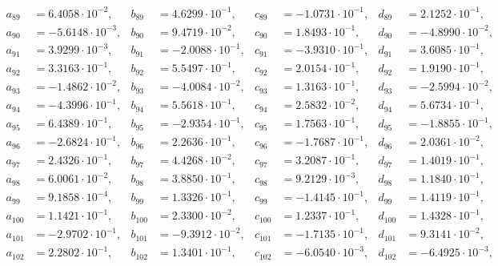 \begin{align*}
  a_{ 89 } &= 6.4058 \cdot 10^{ -2 }, & b_{ 89 } &= 4.6299 \cdot 10^{ -1 }, & c_{ 89 } &= -1.0731 \cdot 10^{ -1 }, & d_{ 89 } &= 2.1252 \cdot 10^{ -1 }, \\ 
  a_{ 90 } &= -5.6148 \cdot 10^{ -3 }, & b_{ 90 } &= 9.4719 \cdot 10^{ -2 }, & c_{ 90 } &= 1.8493 \cdot 10^{ -1 }, & d_{ 90 } &= -4.8990 \cdot 10^{ -2 }, \\ 
  a_{ 91 } &= 3.9299 \cdot 10^{ -3 }, & b_{ 91 } &= -2.0088 \cdot 10^{ -1 }, & c_{ 91 } &= -3.9310 \cdot 10^{ -1 }, & d_{ 91 } &= 3.6085 \cdot 10^{ -1 }, \\ 
  a_{ 92 } &= 3.3163 \cdot 10^{ -1 }, & b_{ 92 } &= 5.5497 \cdot 10^{ -1 }, & c_{ 92 } &= 2.0154 \cdot 10^{ -1 }, & d_{ 92 } &= 1.9190 \cdot 10^{ -1 }, \\ 
  a_{ 93 } &= -1.4862 \cdot 10^{ -2 }, & b_{ 93 } &= -4.0084 \cdot 10^{ -2 }, & c_{ 93 } &= 1.3163 \cdot 10^{ -1 }, & d_{ 93 } &= -2.5994 \cdot 10^{ -2 }, \\ 
  a_{ 94 } &= -4.3996 \cdot 10^{ -1 }, & b_{ 94 } &= 5.5618 \cdot 10^{ -1 }, & c_{ 94 } &= 2.5832 \cdot 10^{ -2 }, & d_{ 94 } &= 5.6734 \cdot 10^{ -1 }, \\ 
  a_{ 95 } &= 6.4389 \cdot 10^{ -1 }, & b_{ 95 } &= -2.9354 \cdot 10^{ -1 }, & c_{ 95 } &= 1.7563 \cdot 10^{ -1 }, & d_{ 95 } &= -1.8855 \cdot 10^{ -1 }, \\ 
  a_{ 96 } &= -2.6824 \cdot 10^{ -1 }, & b_{ 96 } &= 2.2636 \cdot 10^{ -1 }, & c_{ 96 } &= -1.7687 \cdot 10^{ -1 }, & d_{ 96 } &= 2.0361 \cdot 10^{ -2 }, \\ 
  a_{ 97 } &= 2.4326 \cdot 10^{ -1 }, & b_{ 97 } &= 4.4268 \cdot 10^{ -2 }, & c_{ 97 } &= 3.2087 \cdot 10^{ -1 }, & d_{ 97 } &= 1.4019 \cdot 10^{ -1 }, \\ 
  a_{ 98 } &= 6.0061 \cdot 10^{ -2 }, & b_{ 98 } &= 3.8850 \cdot 10^{ -1 }, & c_{ 98 } &= 9.2129 \cdot 10^{ -3 }, & d_{ 98 } &= 1.1840 \cdot 10^{ -1 }, \\ 
  a_{ 99 } &= 9.1858 \cdot 10^{ -4 }, & b_{ 99 } &= 1.3326 \cdot 10^{ -1 }, & c_{ 99 } &= -1.4145 \cdot 10^{ -1 }, & d_{ 99 } &= 1.4119 \cdot 10^{ -1 }, \\ 
  a_{ 100 } &= 1.1421 \cdot 10^{ -1 }, & b_{ 100 } &= 2.3300 \cdot 10^{ -2 }, & c_{ 100 } &= 1.2337 \cdot 10^{ -1 }, & d_{ 100 } &= 1.4328 \cdot 10^{ -1 }, \\ 
  a_{ 101 } &= -2.9702 \cdot 10^{ -1 }, & b_{ 101 } &= -9.3912 \cdot 10^{ -2 }, & c_{ 101 } &= -1.7135 \cdot 10^{ -1 }, & d_{ 101 } &= 9.3141 \cdot 10^{ -2 }, \\ 
  a_{ 102 } &= 2.2802 \cdot 10^{ -1 }, & b_{ 102 } &= 1.3401 \cdot 10^{ -1 }, & c_{ 102 } &= -6.0540 \cdot 10^{ -3 }, & d_{ 102 } &= -6.4925 \cdot 10^{ -3 }, \\ 

\end{align*}
